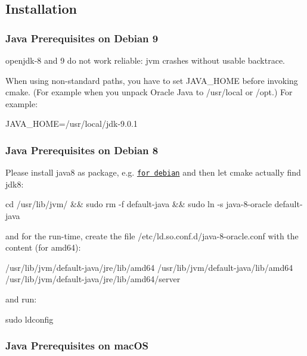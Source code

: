 \subsection*{Installation}

\subsubsection*{Java Prerequisites on Debian 9}

openjdk-\/8 and 9 do not work reliable\+: jvm crashes without usable backtrace.

When using non-\/standard paths, you have to set J\+A\+V\+A\+\_\+\+H\+O\+ME before invoking cmake. (For example when you unpack Oracle Java to {\ttfamily /usr/local} or {\ttfamily /opt}.) For example\+:


\begin{DoxyCode}
JAVA\_HOME=/usr/local/jdk-9.0.1
\end{DoxyCode}


\subsubsection*{Java Prerequisites on Debian 8}

Please install java8 as package, e.\+g. \href{http://www.webupd8.org/2014/03/how-to-install-oracle-java-8-in-debian.html}{\tt for debian} and then let cmake actually find jdk8\+:


\begin{DoxyCode}
cd /usr/lib/jvm/ && sudo rm -f default-java && sudo ln -s java-8-oracle default-java
\end{DoxyCode}


and for the run-\/time, create the file {\ttfamily /etc/ld.so.\+conf.\+d/java-\/8-\/oracle.conf} with the content (for amd64)\+:


\begin{DoxyCode}
/usr/lib/jvm/default-java/jre/lib/amd64
/usr/lib/jvm/default-java/lib/amd64
/usr/lib/jvm/default-java/jre/lib/amd64/server
\end{DoxyCode}


and run\+:


\begin{DoxyCode}
sudo ldconfig
\end{DoxyCode}


\subsubsection*{Java Prerequisites on mac\+OS}

